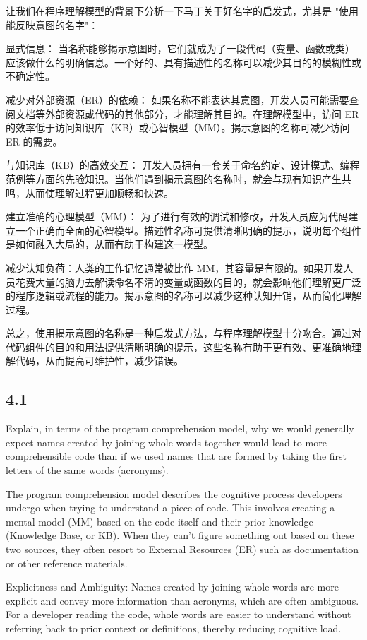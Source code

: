 \documentclass[]{ctexbook}
\begin{document}
让我们在程序理解模型的背景下分析一下马丁关于好名字的启发式，尤其是 "使用能反映意图的名字"：

显式信息： 当名称能够揭示意图时，它们就成为了一段代码（变量、函数或类）应该做什么的明确信息。一个好的、具有描述性的名称可以减少其目的的模糊性或不确定性。

减少对外部资源（ER）的依赖： 如果名称不能表达其意图，开发人员可能需要查阅文档等外部资源或代码的其他部分，才能理解其目的。在理解模型中，访问 ER 的效率低于访问知识库（KB）或心智模型（MM）。揭示意图的名称可减少访问 ER 的需要。

与知识库（KB）的高效交互： 开发人员拥有一套关于命名约定、设计模式、编程范例等方面的先验知识。当他们遇到揭示意图的名称时，就会与现有知识产生共鸣，从而使理解过程更加顺畅和快速。

建立准确的心理模型（MM）： 为了进行有效的调试和修改，开发人员应为代码建立一个正确而全面的心智模型。描述性名称可提供清晰明确的提示，说明每个组件是如何融入大局的，从而有助于构建这一模型。

减少认知负荷：人类的工作记忆通常被比作 MM，其容量是有限的。如果开发人员花费大量的脑力去解读命名不清的变量或函数的目的，就会影响他们理解更广泛的程序逻辑或流程的能力。揭示意图的名称可以减少这种认知开销，从而简化理解过程。

总之，使用揭示意图的名称是一种启发式方法，与程序理解模型十分吻合。通过对代码组件的目的和用法提供清晰明确的提示，这些名称有助于更有效、更准确地理解代码，从而提高可维护性，减少错误。

\subsection{4.1}
Explain, in terms of the program comprehension model, why we would generally expect names created by joining whole words together would lead to more comprehensible code than if we used names that are formed by taking the first letters of the same words (acronyms).

The program comprehension model describes the cognitive process developers undergo when trying to understand a piece of code. This involves creating a mental model (MM) based on the code itself and their prior knowledge (Knowledge Base, or KB). When they can't figure something out based on these two sources, they often resort to External Resources (ER) such as documentation or other reference materials.

Explicitness and Ambiguity: Names created by joining whole words are more explicit and convey more information than acronyms, which are often ambiguous. For a developer reading the code, whole words are easier to understand without referring back to prior context or definitions, thereby reducing cognitive load.
\end{document}
